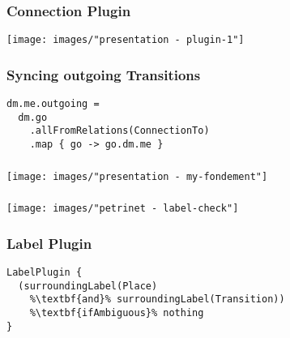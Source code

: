 \begin{frame}
  \frametitle{Connection Plugin}
  \hspace{-1cm}
  \texttt{[image: images/"presentation - plugin-1"]}
\end{frame}

\begin{frame}[fragile]
  \frametitle{Syncing outgoing Transitions}
\vspace*{-1cm}
  \begin{lstlisting}
dm.me.outgoing = 
  dm.go
    .allFromRelations(ConnectionTo)
    .map { go -> go.dm.me }
  \end{lstlisting}
\end{frame}

\begin{frame}
  \frametitle{}
  \hspace{-1cm}
  \texttt{[image: images/"presentation - my-fondement"]}
\end{frame}


\begin{frame}
  \frametitle{}
  \centering
  \hspace{-1cm}
  \texttt{[image: images/"petrinet - label-check"]}
\end{frame}

\begin{frame}[fragile]
  \frametitle{Label Plugin}
  \vspace*{-1cm}
  \begin{lstlisting}[escapechar=\%]
LabelPlugin {
  (surroundingLabel(Place)
    %\textbf{and}% surroundingLabel(Transition)) 
    %\textbf{ifAmbiguous}% nothing
}
  \end{lstlisting}  
\end{frame}

